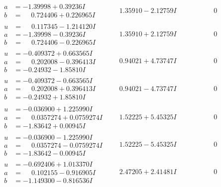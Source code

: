 \documentclass[1p]{elsarticle_modified}
\theoremstyle{definition}
\begin{document}
$$\begin{array}{c|c|c}
\begin{aligned}
a &= -1.39998 + 0.39236 I \\
b &= \phantom{-}0.724406 + 0.226965 I\end{aligned}
 & \phantom{-}1.35910 - 2.12759 I & \phantom{-0.000000 } 0 \\ \hline\begin{aligned}
u &= \phantom{-}0.117345 - 1.214120 I \\
a &= -1.39998 - 0.39236 I \\
b &= \phantom{-}0.724406 - 0.226965 I\end{aligned}
 & \phantom{-}1.35910 + 2.12759 I & \phantom{-0.000000 } 0 \\ \hline\begin{aligned}
u &= -0.409372 + 0.663565 I \\
a &= \phantom{-}0.202008 - 0.396413 I \\
b &= -0.24932 - 1.85810 I\end{aligned}
 & \phantom{-}0.94021 + 4.73747 I & \phantom{-0.000000 } 0 \\ \hline\begin{aligned}
u &= -0.409372 - 0.663565 I \\
a &= \phantom{-}0.202008 + 0.396413 I \\
b &= -0.24932 + 1.85810 I\end{aligned}
 & \phantom{-}0.94021 - 4.73747 I & \phantom{-0.000000 } 0 \\ \hline\begin{aligned}
u &= -0.036900 + 1.225990 I \\
a &= \phantom{-}0.0357274 + 0.0759274 I \\
b &= -1.83642 + 0.00945 I\end{aligned}
 & \phantom{-}1.52225 + 5.45325 I & \phantom{-0.000000 } 0 \\ \hline\begin{aligned}
u &= -0.036900 - 1.225990 I \\
a &= \phantom{-}0.0357274 - 0.0759274 I \\
b &= -1.83642 - 0.00945 I\end{aligned}
 & \phantom{-}1.52225 - 5.45325 I & \phantom{-0.000000 } 0 \\ \hline\begin{aligned}
u &= -0.692406 + 1.013370 I \\
a &= \phantom{-}0.102155 - 0.916905 I \\
b &= -1.149300 - 0.816536 I\end{aligned}
 & \phantom{-}2.47205 + 2.41481 I & \phantom{-0.000000 } 0 \\ \hline\begin{aligned}

\end{aligned}
\end{array}$$
\end{document}
